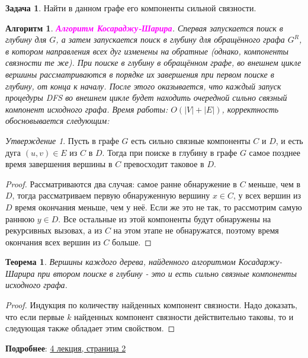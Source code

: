 \documentclass[a4paper]{article}
\theoremstyle{indented}
\newtheorem{theorem}{Теорема}
\newtheorem{alg}{Алгоритм}
\theoremstyle{definition}
\newtheorem{prob}{Задача}
\theoremstyle{remark}
\newtheorem{stat}{Утверждение}
\begin{document}
\begin{prob}
    Найти в данном графе его компоненты сильной связности. 
\end{prob}

\begin{alg}
    \textcolor{magenta}{\hypertarget{t13}{\textbf{Алгоритм Косараджу-Шарира}}}. Спервая запускается поиск в глубину для $G$, а затем запускается поиск в глубину для обращённого графа $G^R$, в котором направления всех дуг изменены на обратные (однако, компоненты связности те же). При поиске в глубину в обращённом графе, во внешнем цикле вершины рассматриваются в порядке их завершения при первом поиске в глубину, от конца к началу. После этого оказывается, что каждый запуск процедуры DFS во внешнем цикле будет находить очередной сильно связный компонент исходного графа. Время работы: $O(|V|+|E|)$, корректность обосновывается следующим:
\end{alg}

\begin{stat}
    Пусть в графе $G$ есть сильно связные компоненты $C$ и $D$, и есть дуга $(u, v)\in E$ из $C$ в $D$. Тогда при поиске в глубину в графе $G$ самое позднее время завершения вершины в $C$ превосходит таковое в $D$. 
\end{stat}

\begin{proof}
    Рассматриваются два случая: самое ранне обнаружение в $C$ меньше, чем в $D$, тогда рассматриваем первую обнаруженную вершину $x\in C$, у всех вершин из $D$ время окончания меньше, чем у неё. Если же это не так, то рассмотрим самую раннюю $y\in D$. Все остальные из этой компоненты будут обнаружены на рекурсивных вызовах, а из $C$ на этом этапе не обнаружатся, поэтому время окончания всех вершин из $C$ больше. 
\end{proof}

\begin{theorem}
    Вершины каждого дерева, найденного алгоритмом Косадаржу-Шарира при втором поиске в глубину - это и есть сильно связные компоненты исходного графа. 
\end{theorem}

\begin{proof}
    Индукция по количеству найденных компонент связности. Надо доказать, что если первые $k$ найденных компонент связности действительно таковы, то и следующая также обладает этим свойством.
\end{proof}

\textbf{Подробнее}: \href{https://users.math-cs.spbu.ru/~okhotin/teaching/algorithms_2020/okhotin_algorithms_2020_l4.pdf}{4 лекция, страница 2} 
\end{document}
